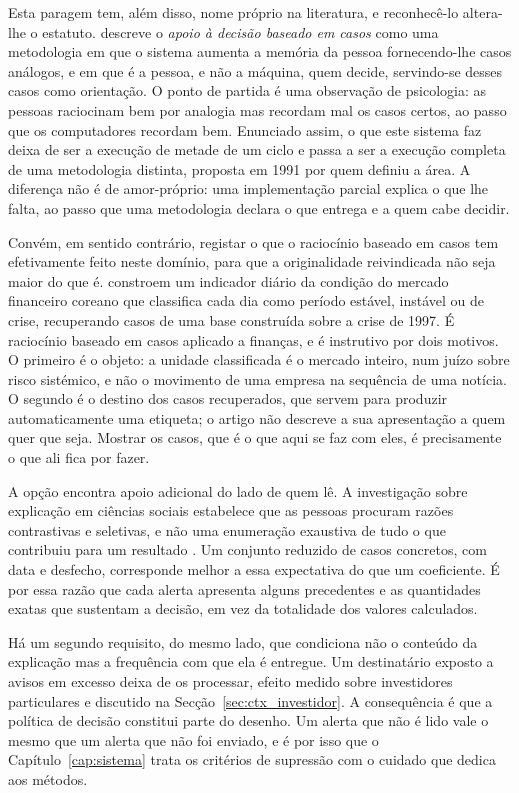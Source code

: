 Esta paragem tem, além disso, nome próprio na literatura, e reconhecê-lo altera-lhe o estatuto.
\textcite{kolodner1991aiding} descreve o \emph{apoio à decisão baseado em casos} como uma
metodologia em que o sistema aumenta a memória da pessoa fornecendo-lhe casos análogos, e em que é
a pessoa, e não a máquina, quem decide, servindo-se desses casos como orientação. O ponto de
partida é uma observação de psicologia: as pessoas raciocinam bem por analogia mas recordam mal os
casos certos, ao passo que os computadores recordam bem. Enunciado assim, o que este sistema faz
deixa de ser a execução de metade de um ciclo e passa a ser a execução completa de uma metodologia
distinta, proposta em 1991 por quem definiu a área. A diferença não é de amor-próprio: uma
implementação parcial explica o que lhe falta, ao passo que uma metodologia declara o que entrega
e a quem cabe decidir.

Convém, em sentido contrário, registar o que o raciocínio baseado em casos tem efetivamente feito
neste domínio, para que a originalidade reivindicada não seja maior do que é.
\textcite{oh2007cbrmonitoring} constroem um indicador diário da condição do mercado financeiro
coreano que classifica cada dia como período estável, instável ou de crise, recuperando casos de
uma base construída sobre a crise de 1997. É raciocínio baseado em casos aplicado a finanças, e é
instrutivo por dois motivos. O primeiro é o objeto: a unidade classificada é o mercado inteiro,
num juízo sobre risco sistémico, e não o movimento de uma empresa na sequência de uma notícia. O
segundo é o destino dos casos recuperados, que servem para produzir automaticamente uma etiqueta;
o artigo não descreve a sua apresentação a quem quer que seja. Mostrar os casos, que é o que aqui
se faz com eles, é precisamente o que ali fica por fazer.

A opção encontra apoio adicional do lado de quem lê. A investigação sobre explicação em ciências
sociais estabelece que as pessoas procuram razões contrastivas e seletivas, e não uma enumeração
exaustiva de tudo o que contribuiu para um resultado \autocite{miller2019explanation}. Um conjunto
reduzido de casos concretos, com data e desfecho, corresponde melhor a essa expectativa do que um
coeficiente. É por essa razão que cada alerta apresenta alguns precedentes e as quantidades exatas
que sustentam a decisão, em vez da totalidade dos valores calculados.

Há um segundo requisito, do mesmo lado, que condiciona não o conteúdo da explicação mas a frequência
com que ela é entregue. Um destinatário exposto a avisos em excesso deixa de os processar, efeito medido sobre
investidores particulares \autocite{liu2023alerts} e discutido na
Secção~\ref{sec:ctx_investidor}. A consequência é que a política de decisão constitui parte do desenho. Um alerta que não
é lido vale o mesmo que um alerta que não foi enviado, e é por isso que o
Capítulo~\ref{cap:sistema} trata os critérios de supressão com o cuidado que dedica aos métodos.

